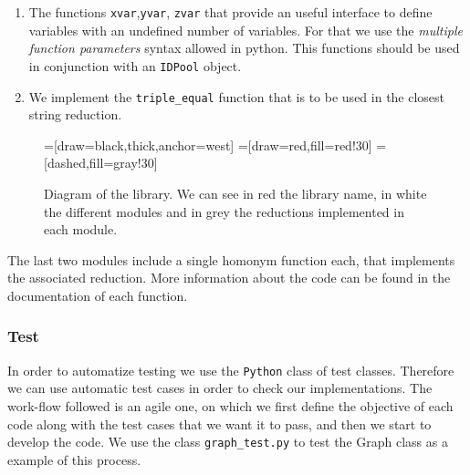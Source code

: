   \begin{enumerate}

  \item The functions \texttt{xvar},\texttt{yvar}, \texttt{zvar} that provide an useful interface to define variables with an undefined number of variables. For that we use the \emph{multiple function parameters} syntax allowed in python. This functions should be used in conjunction with an \texttt{IDPool} object.
    
  \item We implement the \texttt{triple\_equal} function that is to be used in the closest string reduction.
  \end{enumerate}  
\begin{figure}[h]
\begin{center}
=[draw=black,thick,anchor=west]
=[draw=red,fill=red!30]
=[dashed,fill=gray!30]
  \caption{Diagram of the library. We can see in red the library name, in white the different modules and in grey the reductions implemented in each module. }
\label{fig:org}
\end{center}
\end{figure}


The last two modules include a single homonym function each, that implements the associated reduction. More information about the code can be found in the documentation of each function. 

\newpage
\subsubsection{Test}

In order to automatize testing we use the \texttt{Python} class of test classes. Therefore we can use automatic test cases in order to check our implementations. The work-flow followed is an agile one, on which we first define the objective of each code along with the test cases that we want it to pass, and then we start to develop the code. We use the class \texttt{graph\_test.py} to test the Graph class as a example of this process.

